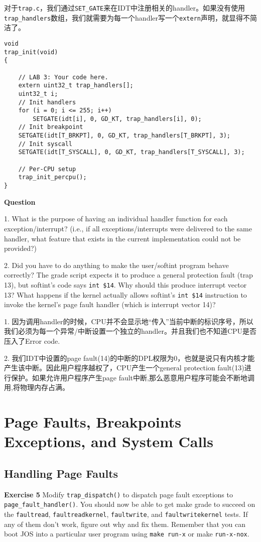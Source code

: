 \documentclass[11pt]{article}
\begin{document}
对于\lstinline|trap.c|，我们通过\lstinline|SET_GATE|来在IDT中注册相关的handler。如果没有使用
\lstinline|trap_handlers|数组，我们就需要为每一个handler写一个\lstinline|extern|声明，就显得不简洁了。
\begin{lstlisting}[title=kern/trap.c]
void
trap_init(void)
{

	// LAB 3: Your code here.
	extern uint32_t trap_handlers[];
	uint32_t i;
	// Init handlers
	for (i = 0; i <= 255; i++)
		SETGATE(idt[i], 0, GD_KT, trap_handlers[i], 0);
	// Init breakpoint
	SETGATE(idt[T_BRKPT], 0, GD_KT, trap_handlers[T_BRKPT], 3);
	// Init syscall
	SETGATE(idt[T_SYSCALL], 0, GD_KT, trap_handlers[T_SYSCALL], 3);

	// Per-CPU setup 
	trap_init_percpu();
}
\end{lstlisting}

\begin{framed}
\noindent\textbf{Question}

1. What is the purpose of having an individual handler function for each exception/interrupt? (i.e., if all exceptions/interrupts were delivered to the same handler, what feature that exists in the current implementation could not be provided?)

2. Did you have to do anything to make the user/softint program behave correctly? The grade script expects it to produce a general protection fault (trap 13), but softint's code says \lstinline|int $14|. Why should this produce interrupt vector 13? What happens if the kernel actually allows softint's \lstinline|int $14| instruction to invoke the kernel's page fault handler (which is interrupt vector 14)?
\end{framed}

1. 因为调用handler的时候，CPU并不会显示地“传入”当前中断的标识序号，所以我们必须为每一个异常/中断设置一个独立的handler。并且我们也不知道CPU是否压入了Error code.

2. 我们IDT中设置的page fault(14)的中断的DPL权限为0，也就是说只有内核才能产生该中断。因此用户程序越权了，CPU产生一个general protection fault(13)进行保护。如果允许用户程序产生page fault中断,那么恶意用户程序可能会不断地调用,将物理内存占满。

\section{Page Faults, Breakpoints Exceptions, and System Calls}
\subsection{Handling Page Faults}
\begin{framed}
\noindent\textbf{Exercise 5} Modify \lstinline|trap_dispatch()| to dispatch page fault exceptions to \lstinline|page_fault_handler()|. You should now be able to get make grade to succeed on the \lstinline|faultread|, \lstinline|faultreadkernel|, \lstinline|faultwrite|, and \lstinline|faultwritekernel| tests. If any of them don't work, figure out why and fix them. Remember that you can boot JOS into a particular user program using \lstinline|make run-x| or make \lstinline|run-x-nox|.
\end{framed}
\end{document}
